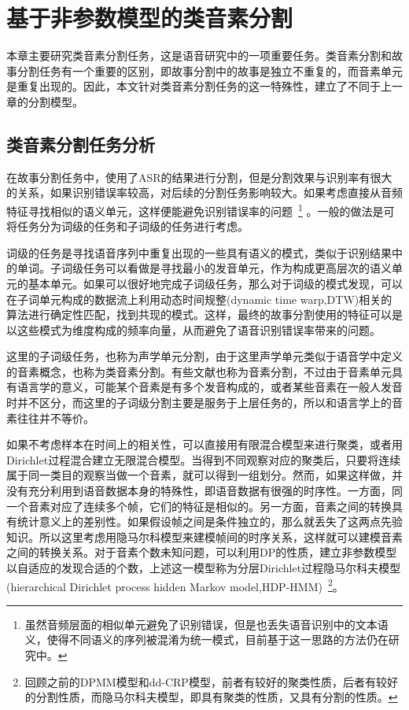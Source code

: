\chapter{基于非参数模型的类音素分割}
本章主要研究类音素分割任务，这是语音研究中的一项重要任务。类音素分割和故事分割任务有一个重要的区别，即故事分割中的故事是独立不重复的，而音素单元是重复出现的。因此，本文针对类音素分割任务的这一特殊性，建立了不同于上一章的分割模型。

\section{类音素分割任务分析}
在故事分割任务中，使用了ASR的结果进行分割，但是分割效果与识别率有很大的关系，如果识别错误率较高，对后续的分割任务影响较大。如果考虑直接从音频特征寻找相似的语义单元，这样便能避免识别错误率的问题~\footnote{虽然音频层面的相似单元避免了识别错误，但是也丢失语音识别中的文本语义，使得不同语义的序列被混淆为统一模式，目前基于这一思路的方法仍在研究中。}
。一般的做法是可将任务分为词级的任务和子词级的任务进行考虑。

词级的任务是寻找语音序列中重复出现的一些具有语义的模式，类似于识别结果中的单词。子词级任务可以看做是寻找最小的发音单元，作为构成更高层次的语义单元的基本单元。如果可以很好地完成子词级任务，那么对于词级的模式发现，可以在子词单元构成的数据流上利用动态时间规整(dynamic time warp,DTW)相关的算法进行确定性匹配，找到共现的模式。这样，最终的故事分割使用的特征可以是以这些模式为维度构成的频率向量，从而避免了语音识别错误率带来的问题。

这里的子词级任务，也称为声学单元分割，由于这里声学单元类似于语音学中定义的音素概念，也称为类音素分割。有些文献也称为音素分割，不过由于音素单元具有语言学的意义，可能某个音素是有多个发音构成的，或者某些音素在一般人发音时并不区分，而这里的子词级分割主要是服务于上层任务的，所以和语言学上的音素往往并不等价。

如果不考虑样本在时间上的相关性，可以直接用有限混合模型来进行聚类，或者用Dirichlet过程混合建立无限混合模型。当得到不同观察对应的聚类后，只要将连续属于同一类目的观察当做一个音素，就可以得到一组划分。然而，如果这样做，并没有充分利用到语音数据本身的特殊性，即语音数据有很强的时序性。一方面，同一个音素对应了连续多个帧，它们的特征是相似的。另一方面，音素之间的转换具有统计意义上的差别性。如果假设帧之间是条件独立的，那么就丢失了这两点先验知识。所以这里考虑用隐马尔科模型来建模帧间的时序关系，这样就可以建模音素之间的转换关系。对于音素个数未知问题，可以利用DP的性质，建立非参数模型以自适应的发现合适的个数，上述这一模型称为分层Dirichlet过程隐马尔科夫模型(hierarchical Dirichlet process hidden Markov model,HDP-HMM)~\footnote{回顾之前的DPMM模型和dd-CRP模型，前者有较好的聚类性质，后者有较好的分割性质，而隐马尔科夫模型，即具有聚类的性质，又具有分割的性质。}。

